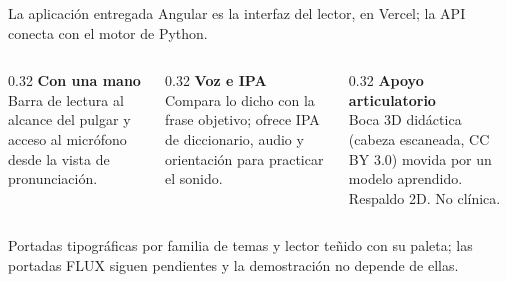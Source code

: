 \documentclass[aspectratio=169,11pt]{beamer}
\newcommand{\cod}[1]{{\ttfamily\small #1}}
\begin{document}
\begin{frame}{La aplicación entregada}
\vspace{1mm}
{\small Angular es la interfaz del lector, en Vercel; la API conecta con el motor de Python.}
\vspace{2mm}

\begin{center}
\end{center}

\vspace{2mm}
\begin{columns}[T]
\begin{column}{0.32\textwidth}
\textbf{\color{llazul} Con una mano}\\[2pt]
{\small Barra de lectura al alcance del pulgar y acceso al micrófono desde
la vista de pronunciación.}
\end{column}
\begin{column}{0.32\textwidth}
\textbf{\color{llazul} Voz e IPA}\\[2pt]
{\small Compara lo dicho con la frase objetivo; ofrece IPA de diccionario,
audio y orientación para practicar el sonido.}
\end{column}
\begin{column}{0.32\textwidth}
\textbf{\color{llazul} Apoyo articulatorio}\\[2pt]
{\small Boca 3D didáctica (cabeza escaneada, CC BY 3.0) movida por un modelo
aprendido. Respaldo 2D. No clínica.}
\end{column}
\end{columns}

\vspace{3mm}
{\footnotesize\color{llgris} Portadas tipográficas por familia de temas y lector teñido
con su paleta; las portadas FLUX siguen pendientes y la demostración no depende de ellas.}
\end{frame}
\end{document}
